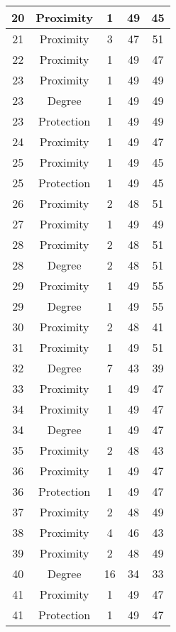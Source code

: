 \documentclass[results.tex]{subfiles}
\begin{document}
\begin{center}
\begin{tabular}{| c || c | c | c | c |}
    \hline
    20 & Proximity & 1 & 49 & 45 \\ 
    \hline
    21 & Proximity & 3 & 47 & 51 \\ 
    \hline
    22 & Proximity & 1 & 49 & 47 \\ 
    \hline
    23 & Proximity & 1 & 49 & 49 \\ 
    \hline
    23 & Degree & 1 & 49 & 49 \\ 
    \hline
    23 & Protection & 1 & 49 & 49 \\ 
    \hline
    24 & Proximity & 1 & 49 & 47 \\ 
    \hline
    25 & Proximity & 1 & 49 & 45 \\ 
    \hline
    25 & Protection & 1 & 49 & 45 \\ 
    \hline
    26 & Proximity & 2 & 48 & 51 \\ 
    \hline
    27 & Proximity & 1 & 49 & 49 \\ 
    \hline
    28 & Proximity & 2 & 48 & 51 \\ 
    \hline
    28 & Degree & 2 & 48 & 51 \\ 
    \hline
    29 & Proximity & 1 & 49 & 55 \\ 
    \hline
    29 & Degree & 1 & 49 & 55 \\ 
    \hline
    30 & Proximity & 2 & 48 & 41 \\ 
    \hline
    31 & Proximity & 1 & 49 & 51 \\ 
    \hline
    32 & Degree & 7 & 43 & 39 \\ 
    \hline
    33 & Proximity & 1 & 49 & 47 \\ 
    \hline
    34 & Proximity & 1 & 49 & 47 \\ 
    \hline
    34 & Degree & 1 & 49 & 47 \\ 
    \hline
    35 & Proximity & 2 & 48 & 43 \\ 
    \hline
    36 & Proximity & 1 & 49 & 47 \\ 
    \hline
    36 & Protection & 1 & 49 & 47 \\ 
    \hline
    37 & Proximity & 2 & 48 & 49 \\ 
    \hline
    38 & Proximity & 4 & 46 & 43 \\ 
    \hline
    39 & Proximity & 2 & 48 & 49 \\ 
    \hline
    40 & Degree & 16 & 34 & 33 \\ 
    \hline
    41 & Proximity & 1 & 49 & 47 \\ 
    \hline
    41 & Protection & 1 & 49 & 47 \\ 

\end{tabular}
\end{center}
\end{document}
